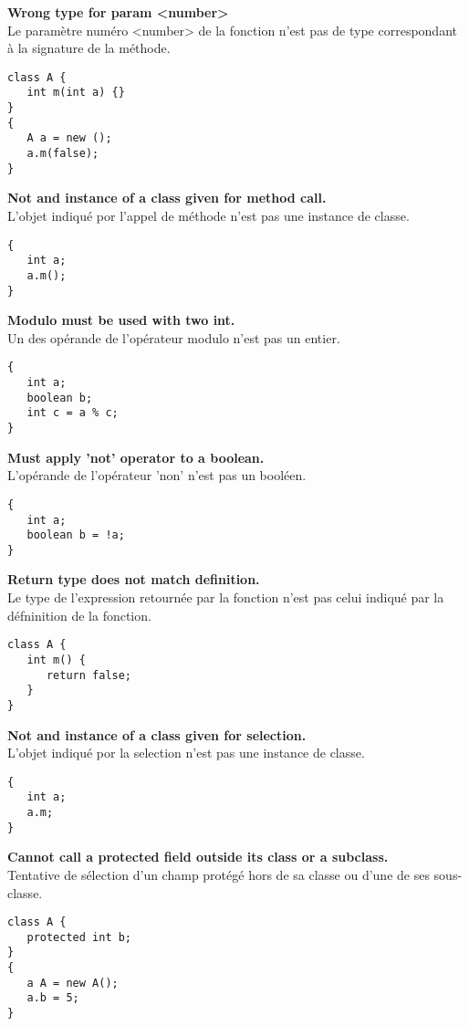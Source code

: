 \documentclass[a4,12pt]{article}
\begin{document}
\textbf{Wrong type for param <number>}\\
Le paramètre numéro <number> de la fonction n'est pas de type correspondant à la signature de la méthode.
\begin{lstlisting}
class A {
   int m(int a) {}
}
{
   A a = new ();
   a.m(false);
}
\end{lstlisting}




\textbf{Not and instance of a class given for method call.}\\
L'objet indiqué por l'appel de méthode n'est pas une instance de classe.
\begin{lstlisting}
{
   int a;
   a.m();
}
\end{lstlisting}




\textbf{Modulo must be used with two int.}\\
Un des opérande de l'opérateur modulo n'est pas un entier.
\begin{lstlisting}
{
   int a;
   boolean b;
   int c = a % c;
}
\end{lstlisting}




\textbf{Must apply 'not' operator to a boolean.}\\
L'opérande de l'opérateur 'non' n'est pas un booléen.
\begin{lstlisting}
{
   int a;
   boolean b = !a;
}
\end{lstlisting}




\textbf{Return type does not match definition.}\\
Le type de l'expression retournée par la fonction n'est pas celui indiqué par la défninition de la fonction.
\begin{lstlisting}
class A {
   int m() {
      return false;
   }
}
\end{lstlisting}




\textbf{Not and instance of a class given for selection.}\\
L'objet indiqué por la selection n'est pas une instance de classe.
\begin{lstlisting}
{
   int a;
   a.m;
}
\end{lstlisting}




\textbf{Cannot call a protected field outside its class or a subclass.}\\
Tentative de sélection d'un champ protégé hors de sa classe ou d'une de ses sous-classe.
\begin{lstlisting}
class A {
   protected int b;
}
{
   a A = new A();
   a.b = 5;
}
\end{lstlisting}
\end{document}
